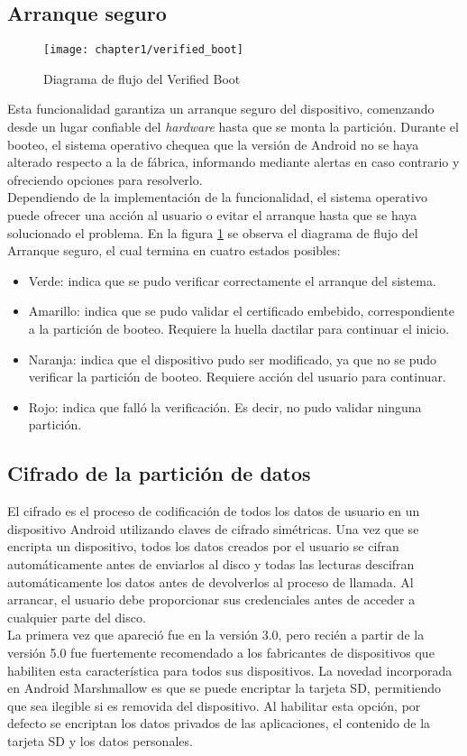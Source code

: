 \subsection{Arranque seguro}
\begin{figure}[!hb]
	\begin{center}
		\texttt{[image: chapter1/verified\_boot]}
		\caption{Diagrama de flujo del Verified Boot \cite{aossec}}
		\label{fig:ch01:verifyBoot}
	\end{center}
\end{figure}
Esta funcionalidad garantiza un arranque seguro del dispositivo, comenzando desde un lugar confiable del \textit{hardware} hasta que se monta la partición. Durante el booteo, el sistema operativo chequea que la versión de Android no se haya alterado respecto a la de fábrica, informando mediante alertas en caso contrario y ofreciendo opciones para resolverlo.\\
Dependiendo de la implementación de la funcionalidad, el sistema operativo puede ofrecer una acción al usuario o evitar el arranque hasta que se haya solucionado el problema. En la figura \ref{fig:ch01:verifyBoot} se observa el diagrama de flujo del Arranque seguro, el cual termina en cuatro estados posibles:
\begin{itemize}
	\item Verde: indica que se pudo verificar correctamente el arranque del sistema.
	\item Amarillo: indica que se pudo validar el certificado embebido, correspondiente a la partición de booteo. Requiere la huella dactilar para continuar el inicio.
	\item Naranja: indica que el dispositivo pudo ser modificado, ya que no se pudo verificar la partición de booteo. Requiere acción del usuario para continuar.
	\item Rojo: indica que falló la verificación. Es decir, no pudo validar ninguna partición.
\end{itemize}
\subsection{Cifrado de la partici\'on de datos}
El cifrado es el proceso de codificación de todos los datos de usuario en un dispositivo Android utilizando claves de cifrado simétricas. Una vez que se encripta un dispositivo, todos los datos creados por el usuario se cifran automáticamente antes de enviarlos al disco y todas las lecturas descifran automáticamente los datos antes de devolverlos al proceso de llamada. Al arrancar, el usuario debe proporcionar sus credenciales antes de acceder a cualquier parte del disco.\\
La primera vez que apareció fue en la versión 3.0, pero recién a partir de la versión 5.0 fue fuertemente recomendado a los fabricantes de dispositivos que habiliten esta característica para todos sus dispositivos. La novedad incorporada en Android Marshmallow es que se puede encriptar la tarjeta SD, permitiendo que sea ilegible si es removida del dispositivo. Al habilitar esta opci\'on, por defecto se encriptan los datos privados de las aplicaciones, el contenido de la tarjeta SD y los datos personales.
